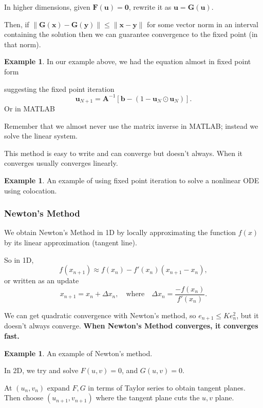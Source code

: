 \documentclass[12pt, a4paper]{article}
\renewcommand{\vec}[1]{\mathbf{#1}}
\theoremstyle{definition}
\newtheorem{example}[thm]{Example}
\theoremstyle{remark}
\numberwithin{equation}{section}
\begin{document}
In higher dimensions, given $\vec{F}(\vec{u})=\vec{0}$, rewrite it as $\vec{u}=\vec{G}(\vec{u})$. 

Then, if $\|\vec{G}(\vec{x})-\vec{G}(\vec{y})\| \le \|\vec{x}-\vec{y}\|$ for some  vector norm in an interval containing the solution then we can guarantee
 convergence to the fixed point  (in that norm).
 
 \begin{example}
 In our example above, we had the equation almost in fixed point form
  
 suggesting the fixed point iteration
  \[ \vec{u}_{N+1} = \vec{A}^{-1} [\vec{b} - (1- \vec{u}_N\odot\vec{u}_N)].\]
 Or  in MATLAB
  
 Remember that we almost never use the matrix inverse in MATLAB; instead we solve the linear system. 
 \end{example}
 
 This method is easy to write and can converge but doesn't always. When it converges usually converges linearly. 
 
  \begin{example}
 An example of using fixed point iteration to solve a nonlinear ODE using colocation. 
 \end{example}

\newpage
\subsubsection{Newton's Method}

We obtain Newton's Method in 1D by locally approximating the function $f(x)$ by its linear approximation (tangent line). 


So in 1D,
\[f(x_{n+1}) \approx f(x_n) - f'(x_n)(x_{n+1}-x_n),\]
or written as an update 
\[x_{n+1} = x_n + \Delta x_n, \quad \text{where} \quad  \Delta x_n = \frac{-f(x_n)}{f'(x_n)}.\]

We can get quadratic convergence with Newton's method, so $e_{n+1} \le K e_{n}^2$, but it doesn't always converge. {\bf When Newton's Method converges, it converges fast.}
 
 \begin{example}
 An example of Newton's method. 
 \end{example}

In 2D, we try and solve $F(u,v)=0$, and $G(u,v)=0$. 

At $(u_n,v_n)$ expand $F,G$ in terms of Taylor series to obtain tangent planes. Then choose $(u_{n+1},v_{n+1})$ where the tangent plane cuts the $u,v$ plane.
\end{document}
